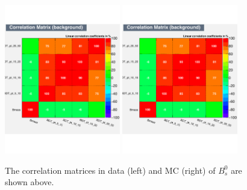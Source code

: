\begin{figure}[h]
\begin{center}
\includegraphics[width=0.45\textwidth]{Figures/Chapter4/BsBDTCorrB.pdf}
\includegraphics[width=0.45\textwidth]{Figures/Chapter4/BsBDTCorrB.pdf}
\caption{The correlation matrices in data (left) and MC (right) of $B^0_s$ are shown above.}
\label{BsBDTCorr}
\end{center}
\end{figure}

